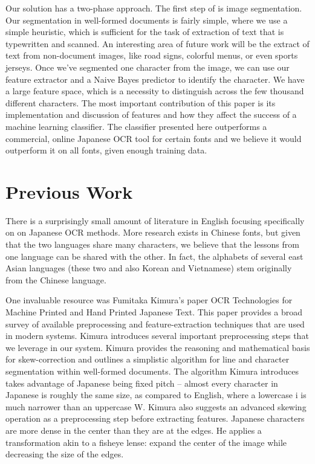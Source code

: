 \documentclass[10pt,twocolumn,letterpaper]{article}
\begin{document}
Our solution has a two-phase approach. The first step of is image segmentation. Our segmentation in well-formed documents is fairly simple, where we use a simple heuristic, which is sufficient for the task of extraction of text that is typewritten and scanned. An interesting area of future work will be the extract of text from non-document images, like road signs, colorful menus, or even sports jerseys. Once we’ve segmented one character from the image, we can use our feature extractor and a Naive Bayes predictor to identify the character. We have a large feature space, which is a necessity to distinguish across the few thousand different characters. The most important contribution of this paper is its implementation and discussion of features and how they affect the success of a machine learning classifier. The classifier presented here outperforms a commercial, online Japanese OCR tool for certain fonts and we believe it would outperform it on all fonts, given enough training data.

\section{Previous Work}
There is a surprisingly small amount of literature in English focusing specifically on on Japanese OCR methods. More research exists in Chinese fonts, but given that the two languages share many characters, we believe that the lessons from one language can be shared with the other. In fact, the alphabets of several east Asian languages (these two and also Korean and Vietnamese) stem originally from the Chinese language.

One invaluable resource was Fumitaka Kimura’s paper OCR Technologies for Machine Printed and Hand Printed Japanese Text. This paper provides a broad survey of available preprocessing and feature-extraction techniques that are used in modern systems. Kimura introduces several important preprocessing steps that we leverage in our system. Kimura provides the reasoning and mathematical basis for skew-correction and outlines a simplistic algorithm for line and character segmentation within well-formed documents. The algorithm Kimura introduces takes advantage of Japanese being fixed pitch -- almost every character in Japanese is roughly the same size, as compared to English, where a lowercase i is much narrower than an uppercase W. Kimura also suggests an advanced skewing operation as a preprocessing step before extracting features. Japanese characters are more dense in the center than they are at the edges. He applies a transformation akin to a fisheye lense: expand the center of the image while decreasing the size of the edges.
\end{document}
